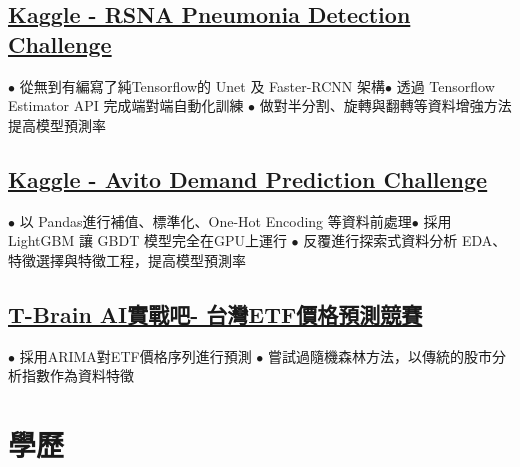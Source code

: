 \documentclass[11pt,a4paper]{moderncv}
\begin{document}
\subsection{\href{https://www.kaggle.com/c/rsna-pneumonia-detection-challenge}{\small Kaggle - RSNA Pneumonia Detection Challenge}}
{\footnotesize{$\bullet$ 從無到有編寫了純Tensorflow的 Unet 及 Faster-RCNN 架構\space\space $\bullet$ 透過 Tensorflow Estimator API 完成端對端自動化訓練
\newline $\bullet$ 做對半分割、旋轉與翻轉等資料增強方法提高模型預測率}}

\subsection{\href{https://www.kaggle.com/c/avito-demand-prediction}{\small Kaggle - Avito Demand Prediction Challenge}}
{\footnotesize{$\bullet$ 以 Pandas進行補值、標準化、One-Hot Encoding 等資料前處理\space\space $\bullet$ 採用 LightGBM 讓 GBDT 模型完全在GPU上運行
\newline $\bullet$ 反覆進行探索式資料分析 EDA、特徵選擇與特徵工程，提高模型預測率}}

\subsection{\href{https://tbrain.trendmicro.com.tw/Competitions/Details/2}{\small T-Brain AI實戰吧- 台灣ETF價格預測競賽}}
{\footnotesize{$\bullet$ 採用ARIMA對ETF價格序列進行預測 \space\space $\bullet$ 嘗試過隨機森林方法，以傳統的股市分析指數作為資料特徵}}
\vspace{-0.7\baselineskip}

\section{學歷}
\vspace{-0.7\baselineskip}
\end{document}
